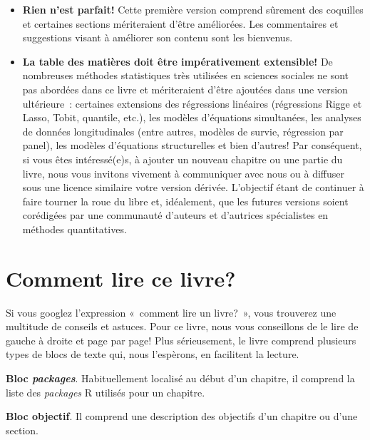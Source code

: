 \documentclass[
  11pt,
  french,
]{book}
\makeatletter
\providecommand{\tightlist}{%
  \setlength{\itemsep}{0pt}\setlength{\parskip}{0pt}}
\newenvironment{kframev}{%
\medskip{}
\setlength{\fboxsep}{.8em}
 \def\at@end@of@kframev{}%
 \ifinner\ifhmode%
  \def\at@end@of@kframev{\end{minipage}}%
  \begin{minipage}{\columnwidth}%
 \fi\fi%
 \def\FrameCommand##1{\hskip\@totalleftmargin \hskip-\fboxsep
 \colorbox{shadebluecolor}{##1}\hskip-\fboxsep
     \hskip-\linewidth \hskip-\@totalleftmargin \hskip\columnwidth}%
 \MakeFramed {\advance\hsize-\width
   \@totalleftmargin\z@ \linewidth\hsize
   \@setminipage}}%
 {\par\unskip\endMakeFramed%
 \at@end@of@kframev}
\newenvironment{rmdblock}[1]
  {
  \begin{itemize}
  \renewcommand{\labelitemi}{
    \raisebox{-.7\height}[0pt][0pt]{
      {\setkeys{Gin}{width=3em,keepaspectratio}\texttt{[image: images/\#1]}}
    }
  }
  \setlength{\fboxsep}{1em}
  \begin{kframev}
  \small
  \item
  }
  {
  \end{kframev}
  \end{itemize}
  }
\newenvironment{bloc_package}
  {\begin{rmdblock}{package}}
  {\end{rmdblock}}
\newenvironment{bloc_objectif}
  {\begin{rmdblock}{objectif}}
  {\end{rmdblock}}
\makeatother
\begin{document}
\begin{itemize}
\tightlist
\item
  \textbf{Rien n'est parfait!} Cette première version comprend sûrement des coquilles et certaines sections mériteraient d'être améliorées. Les commentaires et suggestions visant à améliorer son contenu sont les bienvenus.
\item
  \textbf{La table des matières doit être impérativement extensible!} De nombreuses méthodes statistiques très utilisées en sciences sociales ne sont pas abordées dans ce livre et mériteraient d'être ajoutées dans une version ultérieure~: certaines extensions des régressions linéaires (régressions Rigge et Lasso, Tobit, quantile, etc.), les modèles d'équations simultanées, les analyses de données longitudinales (entre autres, modèles de survie, régression par panel), les modèles d'équations structurelles et bien d'autres! Par conséquent, si vous êtes intéressé(e)s, à ajouter un nouveau chapitre ou une partie du livre, nous vous invitons vivement à communiquer avec nous ou à diffuser sous une licence similaire votre version dérivée. L'objectif étant de continuer à faire tourner la roue du libre et, idéalement, que les futures versions soient corédigées par une communauté d'auteurs et d'autrices spécialistes en méthodes quantitatives.
\end{itemize}

\hypertarget{sect003}{%
\section*{Comment lire ce livre?}\label{sect003}}

Si vous googlez l'expression «~comment lire un livre?~», vous trouverez une multitude de conseils et astuces. Pour ce livre, nous vous conseillons de le lire de gauche à droite et page par page! Plus sérieusement, le livre comprend plusieurs types de blocs de texte qui, nous l'espèrons, en facilitent la lecture.

\begin{bloc_package}
\textbf{Bloc \emph{packages}}. Habituellement localisé au début d'un chapitre, il comprend la liste des \emph{packages} R utilisés pour un chapitre.

\end{bloc_package}

\begin{bloc_objectif}
\textbf{Bloc objectif}. Il comprend une description des objectifs d'un chapitre ou d'une section.

\end{bloc_objectif}
\end{document}
